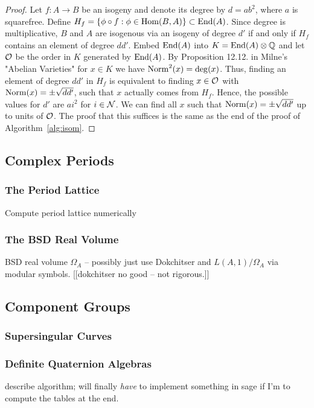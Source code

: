 \documentclass{article}
\begin{document}
\begin{proof}
	Let $f:A \to B$ be an isogeny and denote its degree by $d = ab^2$, where $a$ is
	squarefree. Define $H_f = \{\phi \circ f: \phi \in
		\operatorname{Hom}(B,A)\} \subset \operatorname{End}(A)$. Since degree is multiplicative, $B$ and $A$ are
	isogenous via an isogeny of degree $d'$ if and only if $H_f$ contains an element
	of degree $d d'$. Embed
	$\operatorname{End}(A)$ into $K = \operatorname{End}(A) \otimes \mathbb{Q}$ and let $\mathcal{O}$ be the order in $K$
	generated by $\operatorname{End}(A)$. By Proposition 12.12. in Milne's "Abelian Varieties"
	for $x \in K$ we have $\operatorname{Norm}^2(x) = \deg(x)$. Thus, finding an element of
	degree $dd'$ in $H_f$ is equivalent to finding $x \in \mathcal{O}$ with $\operatorname{Norm}(x) =
		\pm \sqrt{dd'}$, such that $x$ actually comes from $H_f$. Hence, the possible
	values for $d'$ are $a i^2$ for $i \in \mathcal{N}$. We can find all $x$
	such that $\operatorname{Norm}(x) = \pm \sqrt{dd'}$ up to units of $\mathcal{O}$.
	The proof that this suffices is the same as the end of the
	proof of Algorithm~\ref{alg:isom}.
\end{proof}


\subsection{Complex Periods}


\subsubsection{The Period Lattice}
Compute period lattice numerically

\subsubsection{The BSD Real Volume}
BSD real volume $\Omega_A$ -- possibly just use Dokchitser and
$L(A,1)/\Omega_A$ via modular symbols.  [[dokchitser no good -- not rigorous.]]

\subsection{Component Groups}


\subsubsection{Supersingular Curves}

\subsubsection{Definite Quaternion Algebras}
describe algorithm; will finally {\em have} to implement
something in sage if I'm to compute the tables at the end.
\end{document}
